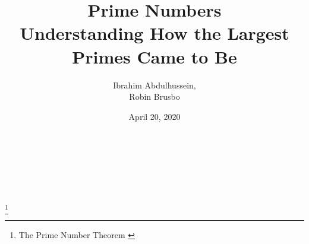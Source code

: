 \documentclass[main.tex]{subfiles}
\begin{document}
\title{%
  Prime Numbers \\[0.25em]
  \large Understanding How the Largest Primes Came to Be}
\author{Ibrahim Abdulhussein, \\ Robin Brusbo}
\date{April 20, 2020}

\makeatletter

\begin{titlepage}
    \thispagestyle{fancy}
    \renewcommand{\headrulewidth}{0pt}
    \renewcommand{\footrulewidth}{0pt}
    \cfoot{}
    \hbox{}\vfill
    \begin{center}
        {\LARGE\@title}\\[2em]
        {\large\@author}\\[1em]
        {\large\@date}\\[6em]
        \\
        \footnote{The Prime Number Theorem \cite{theorem:prime_num}}
    \end{center}
    \vspace{3cm}\vfill
\end{titlepage}

\makeatother
\end{document}
